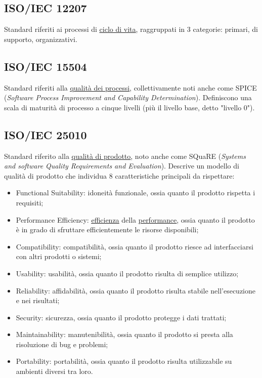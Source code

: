 	\subsection{ISO/IEC 12207}
	\label{sec:iso12207}
	Standard riferiti ai processi di \underline{\hyperref[sec:ciclodivita]{ciclo di vita}}, raggruppati in 3 categorie: primari, di supporto, organizzativi.
	
	\subsection{ISO/IEC 15504}
	\label{sec:iso15504}
	Standard riferiti alla \underline{\hyperref[sec:qualitaprocessi]{qualità dei processi}}, collettivamente noti anche come SPICE (\emph{Software Process Improvement and Capability Determination}). Definiscono una scala di maturità di processo a cinque livelli (più il livello base, detto "livello 0").
	
	\subsection{ISO/IEC 25010}
	\label{sec:iso25010d}
	Standard riferito alla \underline{\hyperref[sec:qualitaprodotto]{qualità di prodotto}}, noto anche come SQuaRE (\emph{Systems and software Quality Requirements and Evaluation}). Descrive un modello di qualità di prodotto che individua 8 caratteristiche principali da rispettare: \begin{itemize}
	\item Functional Suitability: idoneità funzionale, ossia quanto il prodotto rispetta i requisiti;
	\item Performance Efficiency: \underline{\hyperref[sec:efficienza]{efficienza}} della \underline{\hyperref[sec:performance]{performance}}, ossia quanto il prodotto è in grado di sfruttare efficientemente le risorse disponibili;
	\item Compatibility: compatibilità, ossia quanto il prodotto riesce ad interfacciarsi con altri prodotti o sistemi; 
	\item Usability: usabilità, ossia quanto il prodotto risulta di semplice utilizzo;
	\item Reliability: affidabilità, ossia quanto il prodotto risulta stabile nell'esecuzione e nei risultati;
	\item Security: sicurezza, ossia quanto il prodotto protegge i dati trattati;
	\item Maintainability: manutenibilità, ossia quanto il prodotto si presta alla risoluzione di bug e problemi;
	\item Portability: portabilità, ossia quanto il prodotto risulta utilizzabile su ambienti diversi tra loro.
	\end{itemize}

